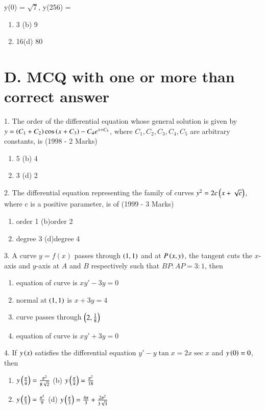 \documentclass[journal,12pt,twocolumn]{IEEEtran}
\theoremstyle{remark}
\begin{document}
y(0) = $\sqrt{7}$,  y(256) = 
\begin{enumerate}[label=(\alph*)]
    \item 3 \quad\quad\quad (b) 9
    \item 16\quad\quad\quad (d) 80
\end{enumerate}
\section*{D. MCQ with one or more than correct answer}

1. The order of the differential equation whose general solution is given by
$y = \left(C_1 + C_2\right) \cos \left(x + C_3\right) - C_4 e^{x+C_5}$, where $C_1, C_2, C_3, C_4, C_5$ are arbitrary constants, is \hfill (1998 - 2 Marks)

\begin{enumerate}[label=(\alph*)]
    \item 5 \quad\quad\quad (b) 4
    \item 3 \quad\quad\quad (d) 2
\end{enumerate}


2. The differential equation representing the family of curves
$y^2 = 2c \left(x + \sqrt{c}\right)$, where c  is a positive parameter, is of \hfill(1999 - 3 Marks)
\begin{enumerate}[label=(\alph*)]
    \item order 1 \quad\quad  (b)order 2
    \item degree 3 \quad (d)degree 4
\end{enumerate}

3. A curve \( y = f(x) \) passes through \( \left(1,1\right) \) and at \( P\left(x, y\right) \), the tangent cuts the \( x \)-axis and \( y \)-axis at \( A \) and \( B \) respectively such that \( BP : AP = 3 : 1 \), then
\begin{enumerate}[label=(\alph*)]
    \item equation of curve is \( xy' - 3y = 0 \)
    \item normal at \( \left(1, 1\right) \) is \( x + 3y = 4 \)
    \item curve passes through \( \left(2, \frac{1}{8}\right) \)
    \item equation of curve is \( xy' + 3y = 0 \)
\end{enumerate}

4. If \( y\left(x\right) \) satisfies the differential equation \( y' - y \tan x = 2x \sec x \) and \( y\left(0\right) = 0 \), then
\begin{enumerate}[label=(\alph*)]
    \item \( y\left(\frac{\pi}{4}\right) = \frac{\pi^2}{8\sqrt{2}} \) \quad (b) \( y\left(\frac{\pi}{4}\right) = \frac{\pi^2}{18} \) 
    \item \( y\left(\frac{\pi}{3}\right) = \frac{\pi^2}{9} \) \quad \quad (d) \( y\left(\frac{\pi}{3}\right) = \frac{4\pi}{3} + \frac{2\pi^2}{3\sqrt{3}} \)
\end{enumerate}
\end{document}

